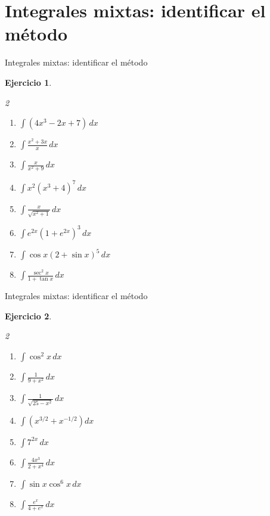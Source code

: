 \documentclass[10pt,aspectratio=169]{beamer}
\newtheorem{Ejer}{Ejercicio}
\begin{document}
\section{Integrales mixtas: identificar el método}
\begin{frame}{Integrales mixtas: identificar el método}
\begin{Ejer}
\begin{multicols}{2}
\begin{enumerate}
\item $\displaystyle \int(4x^3-2x+7)\,dx$
\item $\displaystyle \int\frac{x^2+3x}{x}\,dx$
\item $\displaystyle \int\frac{x}{x^2+9}\,dx$
\item $\displaystyle \int x^2(x^3+4)^7\,dx$
\item $\displaystyle \int\frac{x}{\sqrt{x^2+1}}\,dx$
\item $\displaystyle \int e^{2x}(1+e^{2x})^3\,dx$
\item $\displaystyle \int\cos x(2+\sin x)^5\,dx$
\item $\displaystyle \int\frac{\sec^2x}{1+\tan x}\,dx$
\end{enumerate}
\end{multicols}
\end{Ejer}

\end{frame}


\begin{frame}{Integrales mixtas: identificar el método}
\begin{Ejer}
\begin{multicols}{2}
\begin{enumerate}
\item $\displaystyle \int\cos^2x\,dx$
\item $\displaystyle \int\frac{1}{9+x^2}\,dx$
\item $\displaystyle \int\frac{1}{\sqrt{25-x^2}}\,dx$
\item $\displaystyle \int\left(x^{3/2}+x^{-1/2}\right)dx$
\item $\displaystyle \int 7^{2x}\,dx$
\item $\displaystyle \int\frac{4x^3}{2+x^4}\,dx$
\item $\displaystyle \int\sin x\cos^6x\,dx$
\item $\displaystyle \int\frac{e^x}{4+e^x}\,dx$
\end{enumerate}
\end{multicols}
\end{Ejer}

\end{frame}
\end{document}
